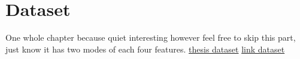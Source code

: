 \chapter{Dataset} 
\label{chapter-dataset} 

One whole chapter because quiet interesting however feel free to skip this part, just know it has two modes of each four features.
\href{http://www.scienceguyrob.com/wp-content/uploads/2016/12/WhyArePulsarsHardToFind_Lyon_2016.pdf}{thesis dataset}
\href{https://archive.ics.uci.edu/ml/datasets/HTRU2}{link dataset}